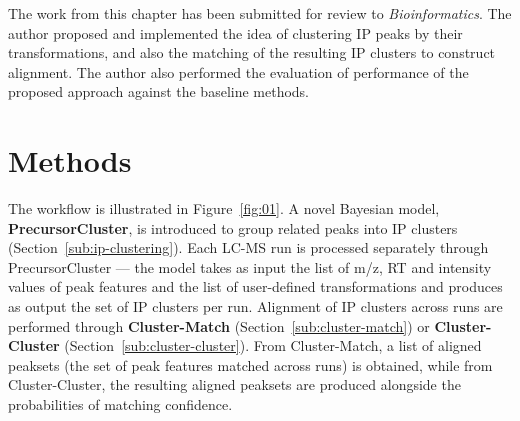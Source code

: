 The work from this chapter has been submitted for review to \textit{Bioinformatics}. The author proposed and implemented the idea of clustering IP peaks by their transformations, and also the matching of the resulting IP clusters to construct alignment. The author also performed the evaluation of performance of the proposed approach against the baseline methods. 

\section{Methods}

The workflow is illustrated in Figure~\ref{fig:01}. A novel Bayesian model, \textbf{PrecursorCluster}, is introduced to group related peaks into IP clusters (Section~\ref{sub:ip-clustering}). Each LC-MS run is processed separately through PrecursorCluster --- the model takes as input the list of m/z, RT and intensity values of peak features and the list of user-defined transformations and produces as output the set of IP clusters per run. Alignment of IP clusters across runs are performed through \textbf{Cluster-Match} (Section~\ref{sub:cluster-match}) or \textbf{Cluster-Cluster} (Section~\ref{sub:cluster-cluster}). From Cluster-Match, a list of aligned peaksets (the set of peak features matched across runs) is obtained, while from Cluster-Cluster, the resulting aligned peaksets are produced alongside the probabilities of matching confidence.

